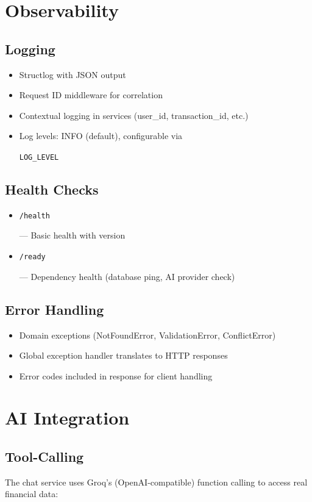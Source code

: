 \documentclass[11pt,a4paper]{article}
\newcommand{\code}[1]{\colorbox{codebg}{\strut\texttt{\small #1}}}
\begin{document}
\section{Observability}

\subsection{Logging}
\begin{itemize}[leftmargin=*,itemsep=1pt]
  \item Structlog with JSON output
  \item Request ID middleware for correlation
  \item Contextual logging in services (user\_id, transaction\_id, etc.)
  \item Log levels: INFO (default), configurable via \code{LOG\_LEVEL}
\end{itemize}

\subsection{Health Checks}
\begin{itemize}[leftmargin=*,itemsep=1pt]
  \item \code{/health} --- Basic health with version
  \item \code{/ready} --- Dependency health (database ping, AI provider check)
\end{itemize}

\subsection{Error Handling}
\begin{itemize}[leftmargin=*,itemsep=1pt]
  \item Domain exceptions (NotFoundError, ValidationError, ConflictError)
  \item Global exception handler translates to HTTP responses
  \item Error codes included in response for client handling
\end{itemize}

\section{AI Integration}

\subsection{Tool-Calling}
The chat service uses Groq's (OpenAI-compatible) function calling to access real financial data:
\end{document}
